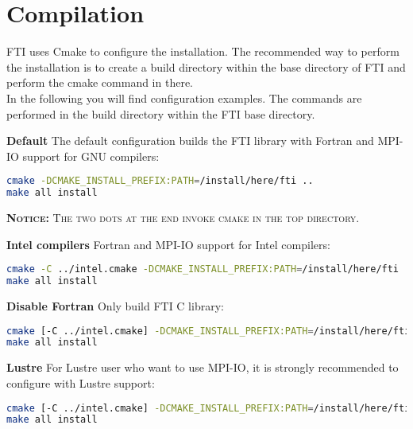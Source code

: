 \documentclass{refrep}
\begin{document}
\chapter{Compilation}
FTI uses Cmake to configure the installation. The recommended way to perform the installation is to create a build directory within the base directory of FTI and perform the cmake command in there. \\
In the following you will find configuration examples. The commands are performed in the build directory within the FTI base directory.

\vspace{2mm}
{\bf Default}
The default configuration builds the FTI library with Fortran and MPI-IO support for GNU compilers:
\begin{lstlisting}[language=bash]
cmake -DCMAKE_INSTALL_PREFIX:PATH=/install/here/fti ..
make all install
\end{lstlisting}
\begin{tcolorbox}
    \textsc{{\bf Notice:} The two dots at the end invoke cmake in the top directory.}
\end{tcolorbox}

\vspace{2mm}
{\bf Intel compilers}
Fortran and MPI-IO support for Intel compilers:
\begin{lstlisting}[language=bash]
cmake -C ../intel.cmake -DCMAKE_INSTALL_PREFIX:PATH=/install/here/fti ..
make all install
\end{lstlisting}

\vspace{2mm}
{\bf Disable Fortran}
Only build FTI C library:
\begin{lstlisting}[language=bash]
cmake [-C ../intel.cmake] -DCMAKE_INSTALL_PREFIX:PATH=/install/here/fti -DENABLE_FORTRAN=OFF ..
make all install
\end{lstlisting}

\vspace{2mm}
{\bf Lustre}
For Lustre user who want to use MPI-IO, it is strongly recommended to configure with Lustre support:
\begin{lstlisting}[language=bash]
cmake [-C ../intel.cmake] -DCMAKE_INSTALL_PREFIX:PATH=/install/here/fti -DENABLE_LUSTRE=ON ..
make all install
\end{lstlisting}
\end{document}

